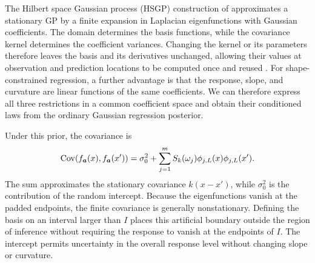 \label{sec:model}

The Hilbert space Gaussian process (HSGP) construction of
\citet{solin2020hsgp} approximates a stationary GP by a finite
expansion in Laplacian eigenfunctions with Gaussian coefficients.
The domain determines the basis functions, while the covariance
kernel determines the coefficient variances. Changing the kernel or
its parameters therefore leaves the basis and its derivatives
unchanged, allowing their values at observation and prediction
locations to be computed once and reused
\citep{riutort2023practicalhsgp}. For shape-constrained regression,
a further advantage is that the response, slope, and curvature are
linear functions of the same coefficients. We can therefore express
all three restrictions in a common coefficient space and obtain
their conditioned laws from the ordinary Gaussian regression posterior.



Under this prior, the covariance is
\[
 \operatorname{Cov}(f_{\boldsymbol a}(x),f_{\boldsymbol a}(x'))
 =\sigma_0^2+\sum_{j=1}^m S_k(\omega_j)
                         \phi_{j,L}(x)\phi_{j,L}(x').
\]
The sum approximates the stationary covariance $k(x-x')$, while
$\sigma_0^2$ is the contribution of the random intercept. Because
the eigenfunctions vanish at the padded endpoints, the finite
covariance is generally nonstationary. Defining the basis on an
interval larger than $I$ places this artificial boundary outside
the region of inference without requiring the response to vanish
at the endpoints of $I$. The intercept permits uncertainty in the
overall response level without changing slope or curvature.



